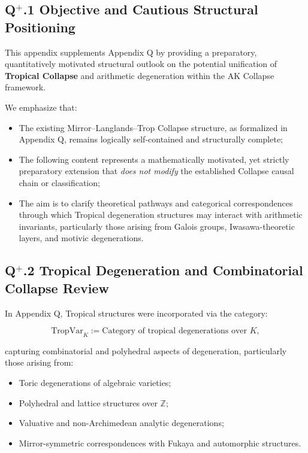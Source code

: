 \documentclass[11pt]{article}
\begin{document}
\subsection*{Q$^{+}$.1 Objective and Cautious Structural Positioning}

This appendix supplements Appendix Q by providing a preparatory, quantitatively motivated structural outlook on the potential unification of \textbf{Tropical Collapse} and arithmetic degeneration within the AK Collapse framework.

We emphasize that:

\begin{itemize}
    \item The existing Mirror--Langlands--Trop Collapse structure, as formalized in Appendix Q, remains logically self-contained and structurally complete;
    \item The following content represents a mathematically motivated, yet strictly preparatory extension that \emph{does not modify} the established Collapse causal chain or classification;
    \item The aim is to clarify theoretical pathways and categorical correspondences through which Tropical degeneration structures may interact with arithmetic invariants, particularly those arising from Galois groups, Iwasawa-theoretic layers, and motivic degenerations.
\end{itemize}

\subsection*{Q$^{+}$.2 Tropical Degeneration and Combinatorial Collapse Review}

In Appendix Q, Tropical structures were incorporated via the category:

\[
\mathrm{TropVar}_K := \text{Category of tropical degenerations over } K,
\]

capturing combinatorial and polyhedral aspects of degeneration, particularly those arising from:

\begin{itemize}
    \item Toric degenerations of algebraic varieties;
    \item Polyhedral and lattice structures over $\mathbb{Z}$;
    \item Valuative and non-Archimedean analytic degenerations;
    \item Mirror-symmetric correspondences with Fukaya and automorphic structures.
\end{itemize}
\end{document}
